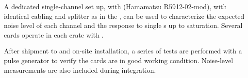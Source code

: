 A dedicated single-channel set up, with  (Hamamatsu R5912-02-mod), with identical cabling and splitter as in the , can be used to characterize the expected noise level of each channel and the response to single \phel{}s up to saturation. 
Several cards operate in each  crate with .

After shipment to  and on-site installation, a series of tests are performed with a pulse generator to verify the cards are in good working condition. Noise-level measurements are also included during integration.

